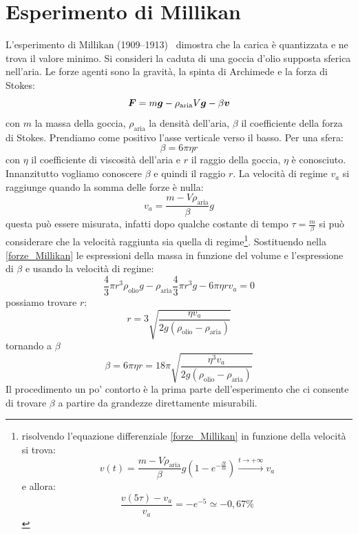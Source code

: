 \section{Esperimento di Millikan}
L'esperimento di Millikan (1909--1913)~\cite{millikan1913} dimostra che la carica è quantizzata e ne trova il valore minimo. Si consideri la caduta di una goccia d'olio supposta sferica nell'aria. Le forze agenti sono la gravità, la spinta di Archimede e la forza di Stokes:
\begin{equation}
	\boldsymbol{F}=m\boldsymbol{g}-\rho_\text{aria}V\boldsymbol{g}-\beta\boldsymbol{v}
	\label{forze_Millikan}
\end{equation}
con $m$ la massa della goccia, $\rho_\text{aria}$ la densità dell'aria, $\beta$ il coefficiente della forza di Stokes. Prendiamo come positivo l'asse verticale verso il basso. Per una sfera:
\begin{equation}
	\beta=6\pi\eta r
	\label{beta_r}
\end{equation}
con $\eta$ il coefficiente di viscosità dell'aria e $r$ il raggio della goccia, $\eta$ è conosciuto. Innanzitutto vogliamo conoscere $\beta$ e quindi il raggio $r$. La velocità di regime $v_a$ si raggiunge quando la somma delle forze è nulla:
\begin{equation}
	v_a=\frac{m-V\rho_\text{aria}}{\beta}g
	\label{va11}
\end{equation}
questa può essere misurata, infatti dopo qualche costante di tempo $\tau=\frac{m}{\beta}$ si può considerare che la velocità raggiunta sia quella di regime\footnote{risolvendo l'equazione differenziale \eqref{forze_Millikan} in funzione della velocità si trova:
\[
	v(t)=\frac{m-V\rho_\text{aria}}{\beta}g\left(1-e^{-\frac{\beta t}{m}}\right)\xrightarrow{t\to +\infty} v_a
\]
e allora:
\[
	\frac{v(5\tau)-v_a}{v_a}=-e^{-5}\simeq -0,67\%
\]
}.
Sostituendo nella \eqref{forze_Millikan} le espressioni della massa in funzione del volume e l'espressione di $\beta$ e usando la velocità di regime:
\begin{equation}
	\frac{4}{3}\pi r^3\rho_{\text{olio}}g-\rho_\text{aria}\frac{4}{3}\pi r^3 g-6\pi\eta r v_a=0
\end{equation}
possiamo trovare $r$:
\begin{equation}
	r=3\sqrt{\frac{\eta v_a}{2g\left(\rho_\text{olio}-\rho_\text{aria}\right)}}
	\label{va14}
\end{equation}
tornando a $\beta$
\begin{equation}
	\beta=6\pi\eta r=18\pi\sqrt{\frac{\eta^3 v_a}{2 g\left(\rho_\text{olio}-\rho_\text{aria}\right)}}
	\label{va15}
\end{equation}
Il procedimento un po' contorto è la prima parte dell'esperimento che ci consente di trovare $\beta$ a partire da grandezze direttamente misurabili.

